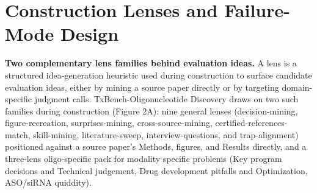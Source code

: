\documentclass[11pt]{article}
\begin{document}
\section{Construction Lenses and Failure-Mode Design}
\textbf{Two complementary lens families behind evaluation ideas.} A lens is a structured idea-generation heuristic used during construction to surface candidate evaluation ideas, either by mining a source paper directly or by targeting domain-specific judgment calls. TxBench-Oligonucleotide Discovery draws on two such families during construction (Figure 2A): nine general lenses (decision-mining, figure-recreation, surprises-mining, cross-source-mining, certified-references-match, skill-mining, literature-sweep, interview-questions, and trap-alignment) positioned against a source paper's Methods, figures, and Results directly, and a three-lens oligo-specific pack for modality specific problems (Key program decisions and Technical judgement, Drug development pitfalls and Optimization, ASO/siRNA quiddity).
\end{document}
